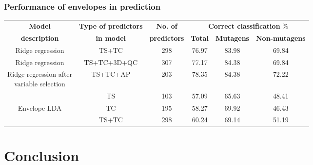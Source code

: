 \documentclass[handout,10pt]{beamer}
\begin{document}
\begin{frame}
\frametitle{Performance of envelopes in prediction}
\begin{scriptsize}
\begin{table}\centering
    \begin{tabular}{|c|c|c|c|c|c|}
    \hline
    \textbf{Model}                                     & \textbf{Type of predictors} & \textbf{No. of}     & \multicolumn{3}{c|}{\textbf{Correct classification} \%}\\\cline{4-6}
    \textbf{description}                               & \textbf{in model}           & \textbf{predictors} & \textbf{Total}                     & \textbf{Mutagens} & \textbf{Non-mutagens} \\ \hline
    Ridge regression                          & TS+TC              & 298        & 76.97                     & 83.98    & 69.84        \\ \hline
    Ridge regression                          & TS+TC+3D+QC        & 307        & 77.17                     & 84.38    & 69.84        \\ \hline
    \pbox{10cm}{Ridge regression after \\variable selection} & TS+TC+AP           & 203        & 78.35                     & 84.38    & 72.22        \\ \hline\hline
                                  & TS                 & 103        & 57.09                     & 65.63    & 48.41        \\\cline{2-6}
    Envelope LDA                                         & TC                 & 195        & 58.27                     & 69.92    & 46.43        \\\cline{2-6}
    ~                                         & TS+TC              & 298          & 60.24 & 69.14        & 51.19            \\ \hline
    \end{tabular}
\end{table}
\end{scriptsize}
\end{frame}

\section{Conclusion}
\end{document}
